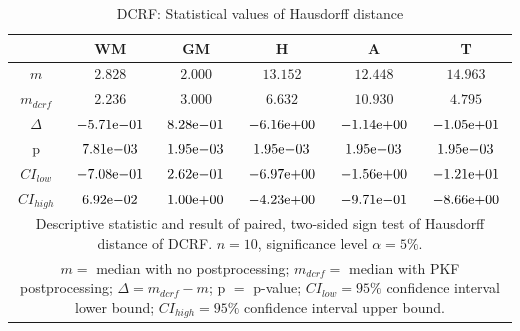 \documentclass[journal]{IEEEtran}
\begin{document}
\begin{table}[h!]

\renewcommand{\arraystretch}{1.3}
\caption{DCRF: Statistical values of Hausdorff distance}
\label{tbl_dcrf_hd}
\centering
\tabcolsep=0.08cm
\begin{tabular}{c|c|c|c|c|c}
\hline
 & WM & GM & H & A & T\\
\hline
$m$&$2.828$&$2.000$&$13.15$2&$12.44$8&$14.963$\\
$m_{dcrf}$&$2.236$&$3.000$&$6.632$&$10.93$0&$4.795$\\
$\Delta$&${-5.71}\mathrm{e}{-01}$&${8.28}\mathrm{e}{-01}$&${-6.16}\mathrm{e}{+00}$&${-1.14}\mathrm{e}{+00}$&${-1.05}\mathrm{e}{+01}$\\
p&${7.81}\mathrm{e}{-03}$&${1.95}\mathrm{e}{-03}$&${1.95}\mathrm{e}{-03}$&${1.95}\mathrm{e}{-03}$&${1.95}\mathrm{e}{-03}$\\
$CI_{low}$&${-7.08}\mathrm{e}{-01}$&${2.62}\mathrm{e}{-01}$&${-6.97}\mathrm{e}{+00}$&${-1.56}\mathrm{e}{+00}$&${-1.21}\mathrm{e}{+01}$\\
$CI_{high}$	&${6.92}\mathrm{e}{-02}$&${1.00}\mathrm{e}{+00}$&${-4.23}\mathrm{e}{+00}$&${-9.71}\mathrm{e}{-01}$&${-8.66}\mathrm{e}{+00}$\\
\hline
\multicolumn{6}{p{3.4in}}{Descriptive statistic and result of paired, two-sided sign test of Hausdorff distance of DCRF. $n=10$, significance level $\alpha = 5\%$.}\\
\multicolumn{6}{p{3.4in}}{$m=$ median with no postprocessing; $m_{dcrf}=$ median with PKF postprocessing; $\Delta=m_{dcrf}-m$; p $=$ p-value;  $CI_{low}= 95\%$ confidence interval lower bound; $CI_{high}= 95\%$ confidence interval upper bound.}\\

\end{tabular}

\end{table}
\end{document}
